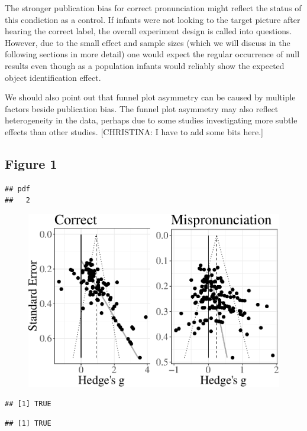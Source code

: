\documentclass[man]{apa6}
\theoremstyle{definition}
\theoremstyle{definition}
\theoremstyle{definition}
\theoremstyle{remark}
\begin{document}
The stronger publication bias for correct pronunciation might reflect
the status of this condiction as a control. If infants were not looking
to the target picture after hearing the correct label, the overall
experiment design is called into questions. However, due to the small
effect and sample sizes (which we will discuss in the following sections
in more detail) one would expect the regular occurrence of null results
even though as a population infants would reliably show the expected
object identification effect.

We should also point out that funnel plot asymmetry can be caused by
multiple factors beside publication bias. The funnel plot asymmetry may
also reflect heterogeneity in the data, perhaps due to some studies
investigating more subtle effects than other studies. {[}CHRISTINA: I
have to add some bits here.{]}

\subsection{Figure 1}\label{figure-1}

\begin{verbatim}
## pdf 
##   2
\end{verbatim}

\begin{figure}[htbp]
\centering
\includegraphics{Paper_Analyses_files/figure-latex/FunnelCombo-1.pdf}
\caption{}
\end{figure}

\begin{verbatim}
## [1] TRUE
\end{verbatim}

\begin{verbatim}
## [1] TRUE
\end{verbatim}
\end{document}
